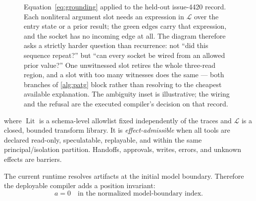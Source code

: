 \begin{figure}[t]
  \centering
  
  \caption{Equation~\eqref{eq:grounding} applied to the held-out issue-4420 record.  Each
  nonliteral argument slot needs an expression in $\mathcal{L}$ over the entry state or a
  prior result; the green edges carry that expression, and the  socket has no
  incoming edge at all.  The diagram therefore asks a strictly harder question than recurrence: not
  ``did this sequence repeat?'' but ``can every socket be wired from an allowed prior
  value?''  One unwitnessed slot retires the whole three-read region, and a slot with too
  many witnesses does the same --- both branches of \cref{alg:patg} block rather than
  resolving to the cheapest available explanation.  The ambiguity inset is illustrative;
  the wiring and the refusal are the executed compiler's decision on that record.}
  \label{fig:provenance-wiring}
\end{figure}

\noindent where $\operatorname{Lit}$ is a schema-level allowlist fixed independently of
the traces and $\mathcal{L}$ is a closed, bounded transform library.  It is
\emph{effect\hyp{}admissible}
when all tools are declared read-only, speculatable, replayable, and within the same
principal/isolation partition.  Handoffs, approvals, writes, errors, and unknown effects
are barriers.

The current runtime resolves artifacts at the initial model boundary.  Therefore the
deployable compiler adds a position invariant:
\begin{equation}
  a=0 \quad\text{in the normalized model-boundary index.}
  \label{eq:prefix}
\end{equation}

